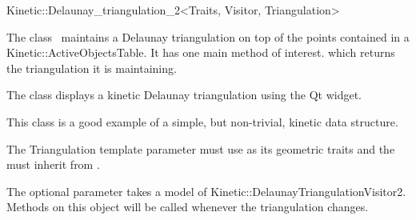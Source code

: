 

\begin{ccRefClass}{Kinetic::Delaunay_triangulation_2<Traits, Visitor, Triangulation>}  %


\ccDefinition
  
The class \ccRefName\ maintains a Delaunay triangulation on top of the
points contained in a Kinetic::ActiveObjectsTable. It has one main method
of interest.  which returns the triangulation it
is maintaining. 

The class  displays a kinetic Delaunay
triangulation using the Qt widget.

This class is a good example of a simple, but non-trivial, kinetic
data structure.

The Triangulation template parameter must use
 as its geometric traits and the
 must inherit from .

The optional  parameter takes a model of
Kinetic::DelaunayTriangulationVisitor2. Methods on this object will be called
whenever the triangulation changes.


\ccIsModel



\ccTypes


\ccCreation
{}  %


\end{ccRefClass}
